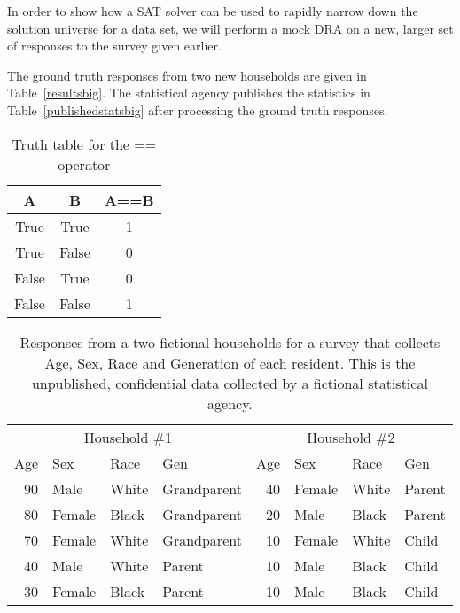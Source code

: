 In order to show how a SAT solver can be used to rapidly narrow down the solution universe for a data set, we will perform a mock DRA on a new, larger set of responses to the survey given earlier.

The ground truth responses from two new households are given in Table~\ref{resultsbig}. The statistical agency publishes the statistics in Table~\ref{publishedstatsbig} after processing the ground truth responses.


\begin{table}[t]
\begin{center}
\begin{tabular}{cc|c}
A & B & A==B  \\
\hline
True & True & 1   \\
True & False & 0  \\
False & True & 0  \\
False & False & 1  \\
\hline
\end{tabular}
\caption{Truth table for the == operator}\label{truthtable}
\end{center}
\end{table}






\begin{table}
\begin{tabular}{rllp{1in}||rllp{1in}}
\multicolumn{4}{c||}{Household \#1}    & \multicolumn{4}{c}{Household \#2} \\
Age & Sex & Race & Gen                 & Age & Sex & Race & Gen \\
\hline
90 & Male & White & Grandparent        & 40 & Female & White & Parent\\
80 & Female & Black & Grandparent      & 20 & Male & Black & Parent\\
70 & Female & White & Grandparent      & 10 & Female & White & Child\\
40 & Male & White & Parent             & 10 & Male & Black & Child\\
30 & Female & Black & Parent           & 10 & Male & Black & Child\\
\hline
\end{tabular}
\caption{Responses from a two fictional households
for a survey that collects Age, Sex, Race and Generation of each resident. This is
the unpublished, confidential data collected by a fictional statistical
agency.}\label{responses}
\end{table}



